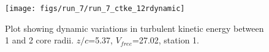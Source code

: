 \begin{figure}[H]
\centering
\texttt{[image: figs/run\_7/run\_7\_ctke\_12rdynamic]}
\caption{Plot showing dynamic variations in turbulent kinetic energy between 1 and 2 core radii. $z/c$=5.37, $V_{free}$=27.02, station 1.}
\label{fig:run_7_ctke_12rdynamic}
\end{figure}


